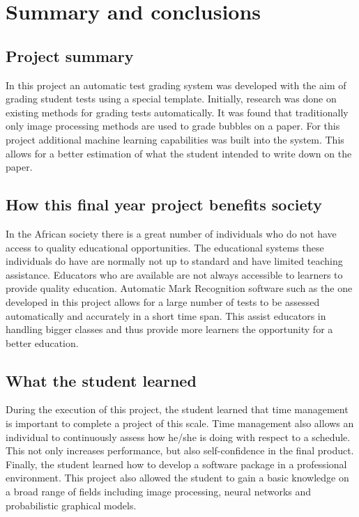 \def\baselinestretch{1}
\chapter{Summary and conclusions}
\label{ch:Conclusions}

\graphicspath{{Conclusions/Figures_Conclusions/}}
\section{Project summary}
In this project an automatic test grading system was developed with the aim of grading student tests using a special template. Initially, research was done on existing methods for grading tests automatically. It was found that traditionally only image processing methods are used to grade bubbles on a paper. For this project additional machine learning capabilities was built into the system. This allows for a better estimation of what the student  intended to write down on the paper.

\section{How this final year project benefits society}
In the African society there is a great number of individuals who do not have access to quality educational opportunities. The educational systems these individuals do have are normally not up to standard and have limited teaching assistance. Educators who are available are not always accessible to learners to provide quality education. Automatic Mark Recognition software such as the one developed in this project allows for a large number of tests to be assessed automatically and accurately in a short time span. This assist educators in handling bigger classes and thus provide more learners the opportunity for a better education.

\section{What the student learned}
During the execution of this project, the student learned that time management is important to complete a project of this scale. Time management also allows an individual to continuously assess how he/she is doing with respect to a schedule. This not only increases performance, but also self-confidence in the final product. Finally, the student learned how to develop a software package in a professional environment. This project also allowed the student to gain a basic knowledge on a broad range of fields including image processing, neural networks and probabilistic graphical models.
